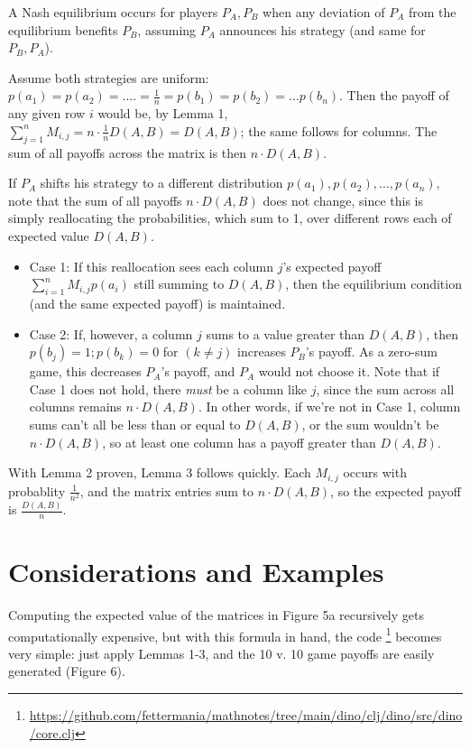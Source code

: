 \documentclass[11pt, oneside]{article} 	%
\begin{document}
A Nash equilibrium occurs for players $P_A, P_B$ when any deviation of $P_A$ from the equilibrium benefits $P_B$, assuming $P_A$ announces his strategy (and same for $P_B, P_A$).

Assume both strategies are uniform: $p(a_1) = p(a_2) = .... = \frac{1}{n} = p(b_1) = p(b_2) = ... p(b_n)$. Then the payoff of any given row $i$ would be, by Lemma 1, $\sum_{j=1}^n M_{i,j} = n \cdot \frac{1}{n} D(A,B) = D(A,B)$; the same follows for columns. The sum of all payoffs across the matrix is then $n \cdot D(A,B)$.

If $P_A$ shifts his strategy to a different distribution $p(a_1), p(a_2), ..., p(a_n)$, note that the sum of all payoffs $n\cdot D(A,B)$ does not change, since this is simply reallocating the probabilities, which sum to 1, over different rows each of expected value $D(A,B)$. 

\begin{itemize}
\item Case 1: If this reallocation sees each column $j$'s expected payoff $\sum_{i=1}^n M_{i,j} p(a_i)$  still summing to $D(A,B)$, then the equilibrium condition (and the same expected payoff) is maintained. 
\item Case 2: If, however, a column $j$ sums to a value greater than $D(A,B)$, then $p(b_j) = 1; p(b_k) = 0$ for $(k \neq j)$ increases $P_B$'s payoff. As a zero-sum game, this decreases $P_A$'s payoff, and $P_A$ would not choose it. Note that if Case 1 does not hold, there \emph{must} be a column like $j$, since the sum across all columns remains $n \cdot D(A,B)$. In other words, if we're not in Case 1, column sums can't all be less than or equal to $D(A,B)$, or the sum wouldn't be $n \cdot D(A,B)$, so at least one column has a payoff greater than $D(A,B)$.
\end{itemize}


With Lemma 2 proven, Lemma 3 follows quickly. Each $M_{i,j}$ occurs with probablity $\frac{1}{n^2}$, and the matrix entries sum to $n \cdot D(A,B)$, so the expected payoff is $\frac{D(A,B)}{n}$.




\section{Considerations and Examples}

Computing the expected value of the matrices in Figure 5a recursively gets computationally expensive, but with this formula in hand, the code \footnote{\url{https://github.com/fettermania/mathnotes/tree/main/dino/clj/dino/src/dino/core.clj}} becomes very simple: just apply Lemmas 1-3, and the 10 v. 10 game payoffs are easily generated (Figure 6).
\end{document}
